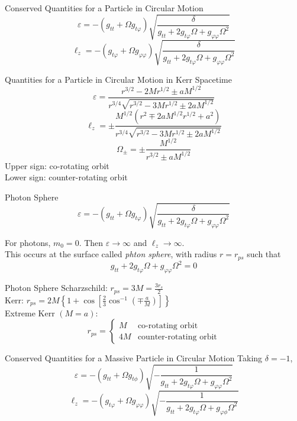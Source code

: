 \documentclass{beamer}
\begin{document}
\begin{frame}{Conserved Quantities for a Particle in Circular Motion}
	\[ \varepsilon = - \left( g_{tt} + \Omega g_{t\varphi} \right) \sqrt{\frac{\delta}{ g_{tt}  + 2g_{t \varphi} \Omega  + g_{\varphi \varphi} \Omega^2 }} \]
	\pause
	\[ \ell_z = - \left( g_{t\varphi} + \Omega g_{\varphi\varphi} \right) \sqrt{\frac{\delta}{ g_{tt}  + 2g_{t \varphi} \Omega  + g_{\varphi \varphi} \Omega^2 }} \]
\end{frame}

\begin{frame}{Quantities for a Particle in Circular Motion in Kerr Spacetime}
	\[ \varepsilon = \frac{r^{3/2} - 2Mr^{1/2} \pm aM^{1/2}}{r^{3/4} \sqrt{r^{3/2} - 3Mr^{1/2} \pm 2aM^{1/2}}} \]
	\pause
	\[ \ell_z = \pm \frac{M^{1/2} \left( r^2 \mp 2aM^{1/2}r^{1/2} + a^2\right) }{r^{3/4} \sqrt{r^{3/2} - 3Mr^{1/2} \pm 2aM^{1/2}}} \]
	\pause
	\[ \Omega_{\pm} = \pm \frac{M^{1/2}}{r^{3/2} \pm aM^{1/2}} \]
	\pause
	\footnotesize{Upper sign: co-rotating orbit\\ Lower sign: counter-rotating orbit}
\end{frame}


\begin{frame}{Photon Sphere}
	\[ \varepsilon = - \left( g_{tt} + \Omega g_{t\varphi} \right) \sqrt{\frac{\delta}{ g_{tt}  + 2g_{t \varphi} \Omega  + g_{\varphi \varphi} \Omega^2 }} \]
	\bigskip
	\pause
	
	For photons, $m_0 =0$. Then  $\varepsilon \rightarrow \infty$ and $\ell_z \rightarrow \infty$.\\
	\pause	
	This occurs at the  surface called \textit{phton sphere}, with radius $r = r_{ps}$ such that   
	\[ g_{tt}  + 2g_{t \varphi} \Omega  + g_{\varphi \varphi} \Omega^2 = 0 \]
\end{frame}

\begin{frame}{Photon Sphere}
	Scharzschild: $r_{ps} = 3M = \frac{3r_s}{2}$\\
	\bigskip	
	\pause
	Kerr: $r_{ps} = 2M\left\lbrace 1+ \cos\left[\frac{2}{3}\cos^{-1} \left(\mp \frac{a}{M} \right) \right] \right\rbrace $\\
	\bigskip	
	\pause
	Extreme Kerr $(M=a)$: 
	\[r_{ps} = 
	\begin{cases}
	M & \textrm{co-rotating orbit}\\
	4M & \textrm{counter-rotating orbit}
	\end{cases} \]
\end{frame}

\begin{frame}{Conserved Quantities for a Massive Particle in Circular Motion}
	Taking $\delta=-1$,
	\pause	
	\[ \varepsilon = - \left( g_{tt} + \Omega g_{t\phi} \right) \sqrt{-\frac{1}{ g_{tt}  + 2g_{t \varphi} \Omega  + g_{\varphi \varphi} \Omega^2 }} \]
	\pause
	\[ \ell_z = - \left( g_{t\varphi} + \Omega g_{\varphi\varphi} \right) \sqrt{-\frac{1}{ g_{tt}  + 2g_{t \varphi} \Omega  + g_{\varphi \phi} \Omega^2 }} \]
\end{frame}
\end{document}
